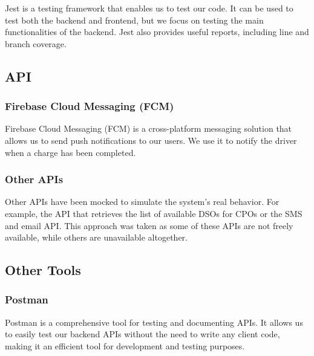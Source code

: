 Jest is a testing framework that enables us to test our code. It can be used to test both the backend and frontend, but we focus on testing the main functionalities of the backend. Jest also provides useful reports, including line and branch coverage.

\subsection{API}

\subsubsection{Firebase Cloud Messaging (FCM)}

Firebase Cloud Messaging (FCM) is a cross-platform messaging solution that allows us to send push notifications to our users. We use it to notify the driver when a charge has been completed.

\subsubsection{Other APIs}

Other APIs have been mocked to simulate the system's real behavior. For example, the API that retrieves the list of available DSOs for CPOs or the SMS and email API. This approach was taken as some of these APIs are not freely available, while others are unavailable altogether.
\subsection{Other Tools}
\subsubsection{Postman}
Postman is a comprehensive tool for testing and documenting APIs. It allows us to easily test our backend APIs without the need to write any client code, making it an efficient tool for development and testing purposes.

